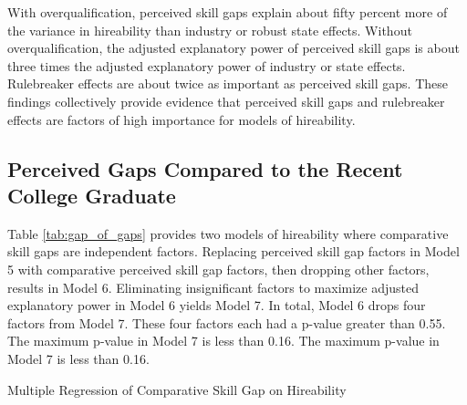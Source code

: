 \documentclass[review]{elsarticle}
\begin{document}
With overqualification, perceived skill gaps explain about fifty percent more of the variance in hireability than industry or robust state effects.
Without overqualification, the adjusted explanatory power of perceived skill gaps is about three times the adjusted explanatory power of industry or state effects.
Rulebreaker effects are about twice as important as perceived skill gaps.
These findings collectively provide evidence that perceived skill gaps and rulebreaker effects are factors of high importance for models of hireability.

\subsection{Perceived Gaps Compared to the Recent College Graduate}

Table \ref{tab:gap_of_gaps} provides two models of hireability where comparative skill gaps are independent factors.
Replacing perceived skill gap factors in Model 5 with comparative perceived skill gap factors, then dropping other factors, results in Model 6.
Eliminating insignificant factors to maximize adjusted explanatory power in Model 6 yields Model 7.
In total, Model 6 drops four factors from Model 7.
These four factors each had a p-value greater than 0.55.
The maximum p-value in Model 7 is less than 0.16.
The maximum p-value in Model 7 is less than 0.16.

\begin{table}
    \caption{Multiple Regression of Comparative Skill Gap on Hireability}
    \resizebox{\columnwidth}{!}{
        
    }
    \label{tab:gap_of_gaps}
\end{table}
\end{document}
